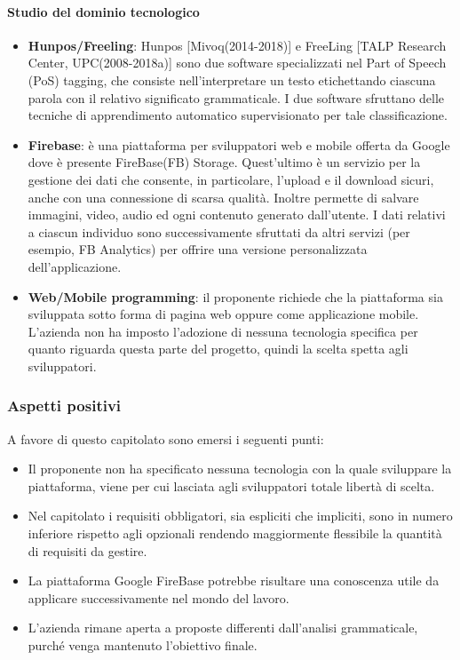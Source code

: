 \paragraph{Studio del dominio tecnologico}
\begin{itemize}
	\item \textbf{Hunpos/Freeling}: Hunpos [Mivoq(2014-2018)] e FreeLing [TALP
	Research Center, UPC(2008-2018a)] sono due software specializzati nel Part
	of Speech (PoS) tagging, che consiste nell'interpretare un testo
	etichettando ciascuna parola con il relativo significato grammaticale. I
	due software sfruttano delle tecniche di apprendimento automatico
	supervisionato per tale classificazione.  
	
	\item \textbf{Firebase}: è una piattaforma per sviluppatori web e mobile
	 offerta da Google dove è presente FireBase(FB) Storage. Quest'ultimo è un
	 servizio per la gestione dei dati che consente, in particolare, l'upload e
	 il download sicuri, anche con una connessione di scarsa qualità. Inoltre 
	 permette di salvare immagini, video, audio ed ogni contenuto generato
	 dall'utente. I dati relativi a ciascun individuo sono successivamente
	 sfruttati da altri servizi (per esempio, FB Analytics) per offrire una versione
	 personalizzata dell'applicazione.
	 
	\item \textbf{Web/Mobile programming}: il proponente richiede che la
	piattaforma sia sviluppata sotto forma di pagina web oppure come
	applicazione mobile. L'azienda non ha imposto l'adozione di nessuna
	tecnologia specifica per quanto riguarda questa parte del progetto, quindi
	la scelta spetta agli sviluppatori.		
\end{itemize}
\subsubsection{Aspetti positivi}
A favore di questo capitolato sono emersi i seguenti punti:
\begin{itemize}
	\item Il proponente non ha specificato nessuna tecnologia con la quale
	 sviluppare la piattaforma, viene per cui lasciata agli sviluppatori totale
	 libertà di scelta.
	\item Nel capitolato i requisiti obbligatori, sia espliciti che impliciti,
	 sono in numero inferiore rispetto agli opzionali rendendo maggiormente
	 flessibile la quantità di requisiti da gestire.
	\item La piattaforma Google FireBase potrebbe risultare una conoscenza
	 utile da applicare successivamente nel mondo del lavoro.
	\item L'azienda rimane aperta a proposte differenti dall'analisi
	 grammaticale, purché venga mantenuto l'obiettivo finale.
	
\end{itemize}
